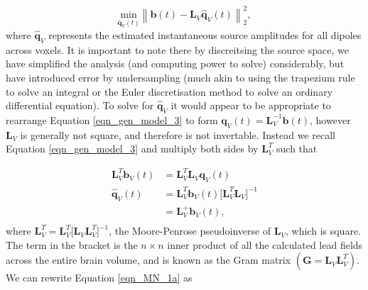 \begin{equation}
\underset{\hat{\mathbf{q}}_V(t)}{\text{min}}\left\| \textbf{b}(t)-\mathbf{L}_V\hat{\mathbf{q}}_V(t)\right\|^2_2,
\end{equation} where $\hat{\mathbf{q}}_V$ represents the estimated instantaneous source amplitudes for all dipoles across voxels. It is important to note there by discreitsing the source space, we have simplified the analysis (and computing power to solve) considerably, but have introduced error by undersampling (much akin to using the trapezium rule to solve an integral or the Euler discretisation method to solve an ordinary differential equation). To solve for $\hat{\mathbf{q}}_V$ it would appear to be appropriate to rearrange Equation \ref{eqn_gen_model_3} to form $\mathbf{q}_V(t) = \mathbf{L}_V^{-1}\mathbf{b}(t)$, however  $\mathbf{L}_V$ is generally not square, and therefore is not invertable. Instead we recall Equation \ref{eqn_gen_model_3} and multiply both sides by $\mathbf{L}_V^T$ such that

\begin{equation}
\begin{aligned}
\mathbf{L}_V^T\mathbf{b}_V(t) &= \mathbf{L}_V^T\mathbf{L}_V \mathbf{q}_V(t)	\\
\hat{\mathbf{q}}_V(t) &= \mathbf{L}_V^T\mathbf{b}_V(t)\big[\mathbf{L}_V^T\mathbf{L}_V\big]^{-1} \\
&= \mathbf{L}_V^+\mathbf{b}_V(t), \\
\end{aligned} \label{eqn_MN_1a}	
\end{equation} where $\mathbf{L}_V^T = \mathbf{L}_V^T\big[\mathbf{L}_V\mathbf{L}_V^T\big]^{-1}$, the Moore-Penrose pseudoinverse of $\mathbf{L}_V$, which is square. The term in the bracket is the $n \times n$ inner product of all the calculated lead fields across the entire brain volume, and is known as the Gram matrix $(\mathbf{G} = \mathbf{L}_V\mathbf{L}_V^T)$. We can rewrite Equation \ref{eqn_MN_1a} as 

